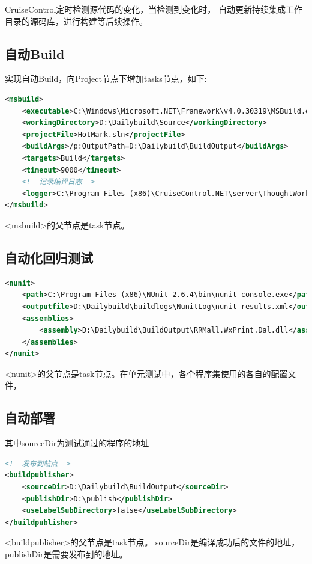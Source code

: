 \documentclass{book}
\begin{document}
CruiseControl定时检测源代码的变化，当检测到变化时，
自动更新持续集成工作目录的源码库，进行构建等后续操作。

\subsection{自动Build}

实现自动Build，向Project节点下增加tasks节点，如下:
\begin{lstlisting}[language=XML]
<msbuild>			 
	<executable>C:\Windows\Microsoft.NET\Framework\v4.0.30319\MSBuild.exe</executable>         
	<workingDirectory>D:\Dailybuild\Source</workingDirectory> 
	<projectFile>HotMark.sln</projectFile> 
	<buildArgs>/p:OutputPath=D:\Dailybuild\BuildOutput</buildArgs> 
	<targets>Build</targets> 
	<timeout>9000</timeout> 
	<!--记录编译日志-->
	<logger>C:\Program Files (x86)\CruiseControl.NET\server\ThoughtWorks.CruiseControl.MSBuild.dll</logger>       
</msbuild>
\end{lstlisting}

<msbuild>的父节点是task节点。

\subsection{自动化回归测试}

\begin{lstlisting}[language=XML]
<nunit> 
	<path>C:\Program Files (x86)\NUnit 2.6.4\bin\nunit-console.exe</path>          
	<outputfile>D:\Dailybuild\buildlogs\NunitLog\nunit-results.xml</outputfile> 
	<assemblies> 
		<assembly>D:\Dailybuild\BuildOutput\RRMall.WxPrint.Dal.dll</assembly> 
	</assemblies> 
</nunit>
\end{lstlisting}

<nunit>的父节点是task节点。在单元测试中，各个程序集使用的各自的配置文件，


\subsection{自动部署}

其中sourceDir为测试通过的程序的地址

\begin{lstlisting}[language=XML]
<!--发布到站点-->
<buildpublisher>
	<sourceDir>D:\Dailybuild\BuildOutput</sourceDir>
	<publishDir>D:\publish</publishDir>
	<useLabelSubDirectory>false</useLabelSubDirectory>
</buildpublisher>
\end{lstlisting}

<buildpublisher>的父节点是task节点。
sourceDir是编译成功后的文件的地址，
publishDir是需要发布到的地址。
\end{document}
